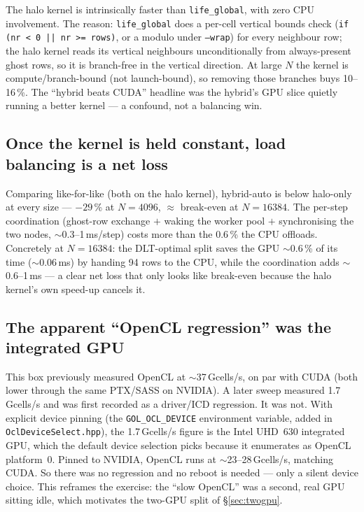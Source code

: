 \documentclass[
	english,
	letterpaper, oneside
]{article}
\begin{document}
The halo kernel is intrinsically faster than \texttt{life\_global}, with zero CPU
involvement. The reason: \texttt{life\_global} does a per-cell vertical bounds check
(\texttt{if (nr < 0 || nr >= rows)}, or a modulo under \texttt{--wrap}) for every
neighbour row; the halo kernel reads its vertical neighbours unconditionally from
always-present ghost rows, so it is branch-free in the vertical direction. At large
$N$ the kernel is compute/branch-bound (not launch-bound), so removing those branches
buys 10--16\,\%. The ``hybrid beats CUDA'' headline was the hybrid's GPU slice quietly
running a better kernel --- a confound, not a balancing win.

\subsection{Once the kernel is held constant, load balancing is a net loss}
\label{sec:netloss}

Comparing like-for-like (both on the halo kernel), hybrid-auto is below halo-only at
every size --- $-29$\,\% at $N=4096$, $\approx$ break-even at $N=16384$. The per-step
coordination (ghost-row exchange $+$ waking the worker pool $+$ synchronising the two
nodes, $\sim$0.3--1\,ms/step) costs more than the 0.6\,\% the CPU offloads. Concretely
at $N=16384$: the DLT-optimal split saves the GPU $\sim$0.6\,\% of its time
($\sim$0.06\,ms) by handing 94 rows to the CPU, while the coordination adds
$\sim$0.6--1\,ms --- a clear net loss that only looks like break-even because the halo
kernel's own speed-up cancels it.

\subsection{The apparent ``OpenCL regression'' was the integrated GPU}
\label{sec:opencl}

This box previously measured OpenCL at $\sim$37\,Gcells/s, on par with CUDA (both
lower through the same PTX/SASS on NVIDIA). A later sweep measured 1.7\,Gcells/s and
was first recorded as a driver/ICD regression. It was not. With explicit device
pinning (the \texttt{GOL\_OCL\_DEVICE} environment variable, added in
\texttt{OclDeviceSelect.hpp}), the 1.7\,Gcells/s figure is the Intel UHD~630
integrated GPU, which the default device selection picks because it enumerates as
OpenCL platform~0. Pinned to NVIDIA, OpenCL runs at $\sim$23--28\,Gcells/s, matching
CUDA. So there was no regression and no reboot is needed --- only a silent device
choice. This reframes the exercise: the ``slow OpenCL'' was a second, real GPU
sitting idle, which motivates the two-GPU split of \S\ref{sec:twogpu}.
\end{document}
